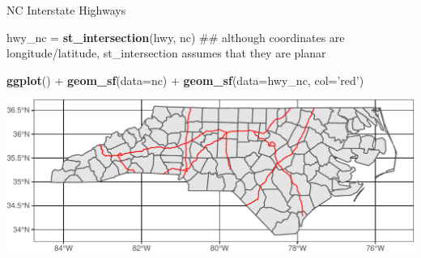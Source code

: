 \documentclass[11pt,ignorenonframetext,]{beamer}
\newenvironment{Shaded}{}{}
\newcommand{\DataTypeTok}[1]{\textcolor[rgb]{0.56,0.13,0.00}{#1}}
\newcommand{\KeywordTok}[1]{\textcolor[rgb]{0.00,0.44,0.13}{\textbf{#1}}}
\newcommand{\NormalTok}[1]{#1}
\newcommand{\OperatorTok}[1]{\textcolor[rgb]{0.40,0.40,0.40}{#1}}
\newcommand{\StringTok}[1]{\textcolor[rgb]{0.25,0.44,0.63}{#1}}
\let\oldShaded\Shaded
\let\endoldShaded\endShaded
\renewenvironment{Shaded}{\footnotesize\begin{spacing}{0.9}\oldShaded}{\endoldShaded\end{spacing}}
\let\oldverbatim\verbatim
\let\endoldverbatim\endverbatim
\newcommand{\scriptoutput}{
  \renewenvironment{Shaded}{\scriptsize\begin{spacing}{0.9}\oldShaded}{\endoldShaded\end{spacing}}
  \renewenvironment{verbatim}{\scriptsize\begin{spacing}{0.9}\oldverbatim}{\endoldverbatim\end{spacing}}
}
\begin{document}
\begin{frame}[fragile,t]{NC Interstate Highways}
\protect\hypertarget{nc-interstate-highways}{}

\scriptoutput

\begin{Shaded}
\begin{Highlighting}[]
\NormalTok{hwy_nc =}\StringTok{ }\KeywordTok{st_intersection}\NormalTok{(hwy, nc)}
\NormalTok{## although coordinates are longitude/latitude, st_intersection assumes that they are planar}

\KeywordTok{ggplot}\NormalTok{() }\OperatorTok{+}\StringTok{ }
\StringTok{  }\KeywordTok{geom_sf}\NormalTok{(}\DataTypeTok{data=}\NormalTok{nc) }\OperatorTok{+}
\StringTok{  }\KeywordTok{geom_sf}\NormalTok{(}\DataTypeTok{data=}\NormalTok{hwy_nc, }\DataTypeTok{col=}\StringTok{'red'}\NormalTok{)}
\end{Highlighting}
\end{Shaded}

\begin{center}\includegraphics[width=\textwidth]{Lec16_files/figure-beamer/unnamed-chunk-30-1} \end{center}

\end{frame}
\end{document}
